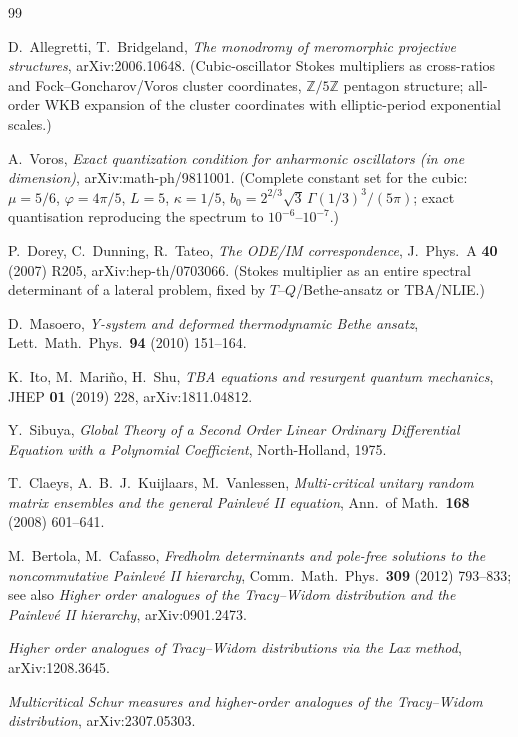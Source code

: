 \documentclass[11pt,reqno]{amsart}
\theoremstyle{plain}
\theoremstyle{definition}
\theoremstyle{remark}
\begin{document}
\begin{thebibliography}{99}

 D.~Allegretti, T.~Bridgeland, \emph{The monodromy of meromorphic
projective structures}, arXiv:2006.10648. (Cubic-oscillator Stokes multipliers as cross-ratios and
Fock--Goncharov/Voros cluster coordinates, $\mathbb Z/5\mathbb Z$ pentagon structure; all-order WKB
expansion of the cluster coordinates with elliptic-period exponential scales.)

 A.~Voros, \emph{Exact quantization condition for anharmonic oscillators (in one
dimension)}, arXiv:math-ph/9811001. (Complete constant set for the cubic: $\mu=5/6$,
$\varphi=4\pi/5$, $L=5$, $\kappa=1/5$, $b_0=2^{2/3}\sqrt3\,\Gamma(1/3)^3/(5\pi)$; exact quantisation
reproducing the spectrum to $10^{-6}$--$10^{-7}$.)

 P.~Dorey, C.~Dunning, R.~Tateo, \emph{The ODE/IM correspondence},
J.~Phys.~A \textbf{40} (2007) R205, arXiv:hep-th/0703066. (Stokes multiplier as an entire spectral
determinant of a lateral problem, fixed by $T$--$Q$/Bethe-ansatz or TBA/NLIE.)

 D.~Masoero, \emph{Y-system and deformed thermodynamic Bethe ansatz},
Lett.~Math.~Phys.~\textbf{94} (2010) 151--164.

 K.~Ito, M.~Mari\~no, H.~Shu, \emph{TBA equations and resurgent quantum
mechanics}, JHEP \textbf{01} (2019) 228, arXiv:1811.04812.

 Y.~Sibuya, \emph{Global Theory of a Second Order Linear Ordinary Differential
Equation with a Polynomial Coefficient}, North-Holland, 1975.

 T.~Claeys, A.~B.~J.~Kuijlaars, M.~Vanlessen, \emph{Multi-critical
unitary random matrix ensembles and the general Painlev\'e II equation}, Ann.\ of Math.\
\textbf{168} (2008) 601--641.

 M.~Bertola, M.~Cafasso, \emph{Fredholm determinants and pole-free solutions
to the noncommutative Painlev\'e II hierarchy}, Comm.\ Math.\ Phys.\ \textbf{309} (2012) 793--833;
see also \emph{Higher order analogues of the Tracy--Widom distribution and the Painlev\'e II
hierarchy}, arXiv:0901.2473.

 \emph{Higher order analogues of Tracy--Widom distributions via the Lax
method}, arXiv:1208.3645.

 \emph{Multicritical Schur measures and higher-order analogues of the
Tracy--Widom distribution}, arXiv:2307.05303.


\end{thebibliography}
\end{document}
